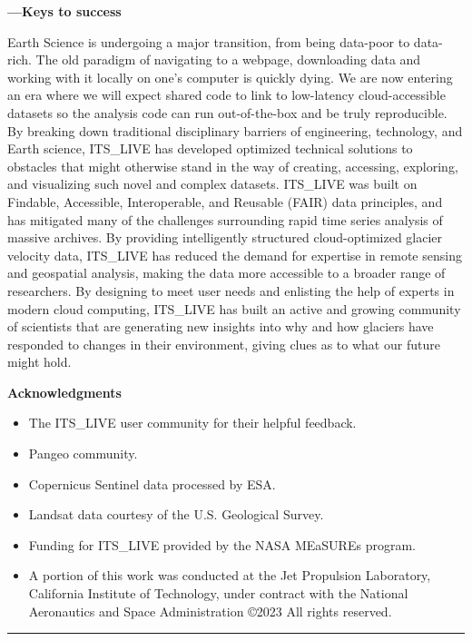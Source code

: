 \documentclass[
  super,
  preprint,
  3p,
  twocolumn]{elsarticle}
\providecommand{\tightlist}{%
  \setlength{\itemsep}{0pt}\setlength{\parskip}{0pt}}\usepackage{longtable,booktabs,array}
\begin{document}
\newpage{}

\clearpage

\textbf{---Keys to success}

Earth Science is undergoing a major transition, from being data-poor to
data-rich. The old paradigm of navigating to a webpage, downloading data
and working with it locally on one's computer is quickly dying. We are
now entering an era where we will expect shared code to link to
low-latency cloud-accessible datasets so the analysis code can run
out-of-the-box and be truly reproducible. By breaking down traditional
disciplinary barriers of engineering, technology, and Earth science,
ITS\_LIVE has developed optimized technical solutions to obstacles that
might otherwise stand in the way of creating, accessing, exploring, and
visualizing such novel and complex datasets. ITS\_LIVE was built on
Findable, Accessible, Interoperable, and Reusable (FAIR) data
principles, and has mitigated many of the challenges surrounding rapid
time series analysis of massive archives. By providing intelligently
structured cloud-optimized glacier velocity data, ITS\_LIVE has reduced
the demand for expertise in remote sensing and geospatial analysis,
making the data more accessible to a broader range of researchers. By
designing to meet user needs and enlisting the help of experts in modern
cloud computing, ITS\_LIVE has built an active and growing community of
scientists that are generating new insights into why and how glaciers
have responded to changes in their environment, giving clues as to what
our future might hold.

\textbf{Acknowledgments}

\begin{itemize}
\tightlist
\item
  The ITS\_LIVE user community for their helpful feedback.
\item
  Pangeo community.
\item
  Copernicus Sentinel data processed by ESA.
\item
  Landsat data courtesy of the U.S. Geological Survey.
\item
  Funding for ITS\_LIVE provided by the NASA MEaSUREs program.
\item
  A portion of this work was conducted at the Jet Propulsion Laboratory,
  California Institute of Technology, under contract with the National
  Aeronautics and Space Administration ©2023 All rights reserved.
\end{itemize}

\begin{center}\rule{0.5\linewidth}{0.5pt}\end{center}
\end{document}
